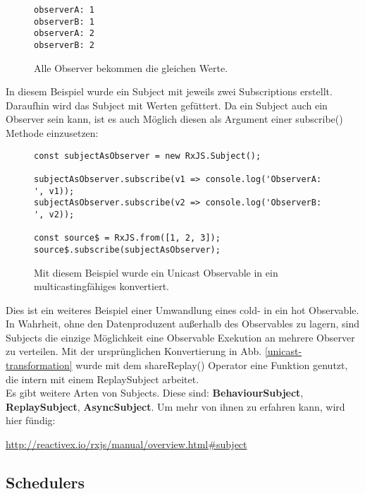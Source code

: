 \begin{figure}[H]
\begin{lstlisting}
observerA: 1
observerB: 1
observerA: 2
observerB: 2
\end{lstlisting}
\caption{Alle Observer bekommen die gleichen Werte.}
\end{figure}

\noindent
In diesem Beispiel wurde ein Subject mit jeweils zwei Subscriptions erstellt. Daraufhin wird das Subject mit Werten \glqq gefüttert\grqq. Da ein Subject auch ein Observer sein kann, ist es auch Möglich diesen als Argument einer subscribe() Methode einzusetzen:

\begin{figure}[H]
\begin{lstlisting}[basicstyle=\small]
const subjectAsObserver = new RxJS.Subject();

subjectAsObserver.subscribe(v1 => console.log('ObserverA: ', v1));
subjectAsObserver.subscribe(v2 => console.log('ObserverB: ', v2));

const source$ = RxJS.from([1, 2, 3]);
source$.subscribe(subjectAsObserver);
\end{lstlisting}
\caption{Mit diesem Beispiel wurde ein Unicast Observable in ein multicastingfähiges konvertiert.}
\end{figure}


\noindent
Dies ist ein weiteres Beispiel einer Umwandlung eines cold- in ein hot Observable. In Wahrheit, ohne den Datenproduzent außerhalb des Observables zu lagern, sind Subjects die einzige Möglichkeit eine Observable Exekution an mehrere Observer zu verteilen. Mit der ursprünglichen Konvertierung in Abb. \ref{unicast-transformation} wurde mit dem shareReplay() Operator eine Funktion genutzt, die intern mit einem ReplaySubject arbeitet.\\

\noindent
Es gibt weitere Arten von Subjects. Diese sind: \textbf{BehaviourSubject}, \textbf{ReplaySubject}, \textbf{AsyncSubject}. Um mehr von ihnen zu erfahren kann, wird hier fündig:

\begin{center}
    \url{http://reactivex.io/rxjs/manual/overview.html#subject}
\end{center}

\subsection{Schedulers}

